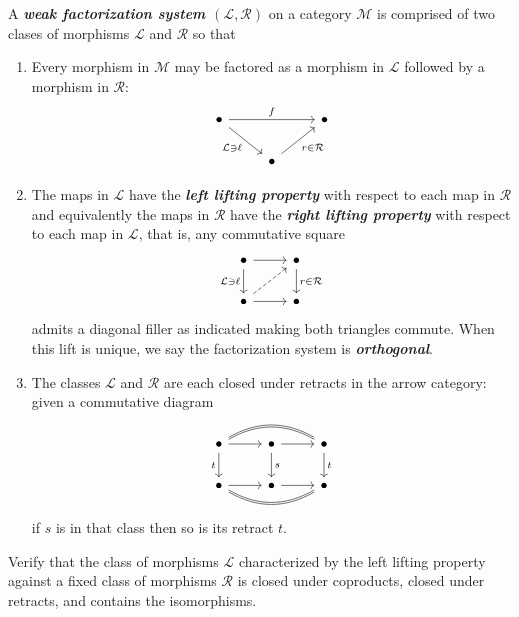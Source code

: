 \begin{defn}
	A \textbf{\textit{weak factorization system $(\mathcal{L},\mathcal{R})$}} on a category $\mathcal{M}$ is comprised of two clases of morphisms $\mathcal{L}$ and $\mathcal{R}$ so that
	\begin{enumerate}
		\item Every morphism in $\mathcal{M}$ may be factored as a morphism in $\mathcal{L}$ followed by a morphism in $\mathcal{R}$:
		\[\begin{tikzcd}
			\bullet\arrow[rr,"f"]\arrow[rd,"\mathcal{L}\ni\ell",swap]&&\bullet\\
			&\bullet\arrow[ru,"r\in \mathcal{R}",swap]
		\end{tikzcd}\]
		\item The maps in $\mathcal{L}$ have the \textbf{\textit{left lifting property}} with respect to each map in $\mathcal{R}$ and equivalently the maps in $\mathcal{R}$ have the \textbf{\textit{right lifting property}} with respect to each map in $\mathcal{L}$, that is, any commutative square
		\[\begin{tikzcd}
			\bullet\arrow[d,"\mathcal{L}\ni\ell",swap]\arrow[r]&\bullet\arrow[d,"r\in\mathcal{R}"]\\
			\bullet\arrow[ur,dashed]\arrow[r]&\bullet
		\end{tikzcd}\]
		admits a diagonal filler as indicated making both triangles commute. When this lift is unique, we say the factorization system is \textbf{\textit{orthogonal}}.
		\item The classes $\mathcal{L}$ and $\mathcal{R}$ are each closed under retracts in the arrow category: given a commutative diagram
		\[\begin{tikzcd}
			\bullet\arrow[r]\arrow[d,"t",swap]\arrow[rr,bend left,no head,shift left=.3]\arrow[rr,bend left,no head,shift right=.3]&\bullet\arrow[r]\arrow[d,"s"]&\bullet\arrow[d,"t"]\\
			\bullet\arrow[r]\arrow[rr,bend right,no head, shift right=.3]\arrow[rr,bend right,no head, shift left=.3]&\bullet\arrow[r]&\bullet
		\end{tikzcd}\]
		if $s$ is in that class then so is its retract $t$.
	\end{enumerate}
\end{defn}

\begin{exercise}[3.1.8, Rihel]
Verify that the class of morphisms $\mathcal{L}$ characterized by the left lifting property against a fixed class of morphisms $\mathcal{R}$ is closed under coproducts, closed under retracts, and contains the isomorphisms.
\end{exercise}


